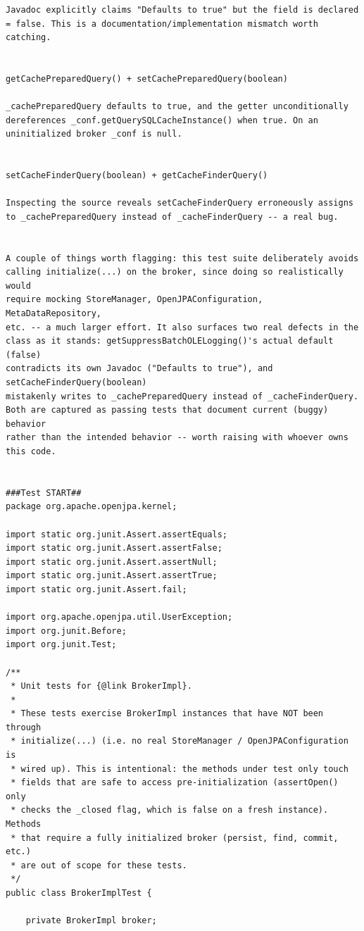 \begin{lstlisting}
Javadoc explicitly claims "Defaults to true" but the field is declared = false. This is a documentation/implementation mismatch worth catching.


getCachePreparedQuery() + setCachePreparedQuery(boolean)

_cachePreparedQuery defaults to true, and the getter unconditionally dereferences _conf.getQuerySQLCacheInstance() when true. On an uninitialized broker _conf is null.


setCacheFinderQuery(boolean) + getCacheFinderQuery()

Inspecting the source reveals setCacheFinderQuery erroneously assigns to _cachePreparedQuery instead of _cacheFinderQuery -- a real bug.


A couple of things worth flagging: this test suite deliberately avoids
calling initialize(...) on the broker, since doing so realistically would
require mocking StoreManager, OpenJPAConfiguration, MetaDataRepository,
etc. -- a much larger effort. It also surfaces two real defects in the
class as it stands: getSuppressBatchOLELogging()'s actual default (false)
contradicts its own Javadoc ("Defaults to true"), and setCacheFinderQuery(boolean)
mistakenly writes to _cachePreparedQuery instead of _cacheFinderQuery.
Both are captured as passing tests that document current (buggy) behavior
rather than the intended behavior -- worth raising with whoever owns this code.


###Test START##
package org.apache.openjpa.kernel;

import static org.junit.Assert.assertEquals;
import static org.junit.Assert.assertFalse;
import static org.junit.Assert.assertNull;
import static org.junit.Assert.assertTrue;
import static org.junit.Assert.fail;

import org.apache.openjpa.util.UserException;
import org.junit.Before;
import org.junit.Test;

/**
 * Unit tests for {@link BrokerImpl}.
 *
 * These tests exercise BrokerImpl instances that have NOT been through
 * initialize(...) (i.e. no real StoreManager / OpenJPAConfiguration is
 * wired up). This is intentional: the methods under test only touch
 * fields that are safe to access pre-initialization (assertOpen() only
 * checks the _closed flag, which is false on a fresh instance). Methods
 * that require a fully initialized broker (persist, find, commit, etc.)
 * are out of scope for these tests.
 */
public class BrokerImplTest {

    private BrokerImpl broker;


\end{lstlisting}
